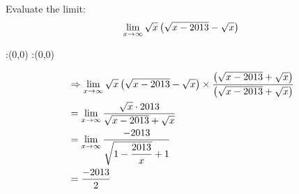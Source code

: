 


\newcommand{\ltinf}{\lim_{x \to \infty}}
\question Evaluate the limit: 
\begin{align}
\lim_{x \to \infty} \sqrt{x} \left( \sqrt{x - 2013} - \sqrt{x} \right) \notag
\end{align}


\watchout

\ifprintanswers
  \begin{marginfigure}
      :(0,0)
      :(0,0)
    \figdrawbegin{}
      \figdrawline [100,101]
    \figdrawend
    \figvisu{\figBoxA}{}{%
    }
    \centerline{\box\figBoxA}
  \end{marginfigure}
\fi 

\begin{solution}
\begin{align}
&\Rightarrow \ltinf \sqrt{x} \left( \sqrt{x - \vbone} - \sqrt{x} \right) \times \dfrac {\left( \sqrt{x - \vbone} + \sqrt{x} \right)}{\left( \sqrt{x - \vbone} + \sqrt{x} \right)} \\
&= \ltinf \dfrac{\sqrt{x} \cdot \vbone} {\sqrt{x -\vbone} + \sqrt{x}} \\
&= \ltinf \dfrac{-\vbone}{\sqrt{1-\dfrac{\vbone}{x}} + 1} \\ 
&= \dfrac{-\vbone}{2}
\end{align}
\end{solution}


